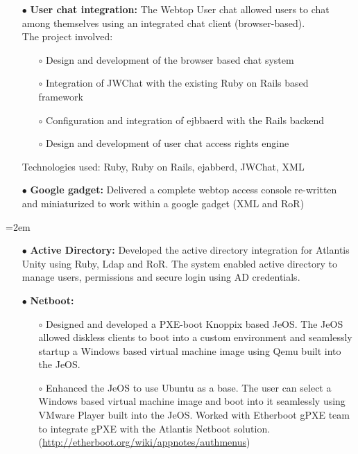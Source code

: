 \documentclass{scrartcl}
\newcommand{\MarginDate}[1]{\marginpar{\raggedleft\itshape\small#1}}
\newcommand{\Description}[1]{\hangindent=2em\hangafter=0\noindent\raggedright\footnotesize{#1}\par\normalsize}
\begin{document}
\begin{cv}{
\href{http://www.develmj.com}{}
}
{\begin{itemize}
\begin{itemize}
engine
    \end{itemize}
    Technologies used: Ruby, Ruby on Rails, Postgres, Gentoo Linux
  \item[\footnotesize$\bullet$] \textbf{User chat integration: }The Webtop User chat allowed users to chat among
    themselves using an integrated chat client (browser-based).\\
    The project involved:
    \begin{itemize}
    \item[\footnotesize$\circ$] Design and development of the browser based chat system
    \item[\footnotesize$\circ$] Integration of JWChat with the existing Ruby on Rails based framework
    \item[\footnotesize$\circ$] Configuration and integration of ejbbaerd with the Rails backend
    \item[\footnotesize$\circ$] Design and development of user chat
      access rights engine
    \end{itemize}
    Technologies used: Ruby, Ruby on Rails, ejabberd, JWChat, XML
  \item[\footnotesize$\bullet$] \textbf{Google gadget: }Delivered a complete
    webtop access console re-written and miniaturized to work within a
    google gadget (XML and RoR)
\end{itemize}
}

\vspace{0.5em}

\Description{
\begin{itemize}
  \item[\footnotesize$\bullet$] \textbf{Active Directory: }Developed\MarginDate{Atlantis Unity}
    the active directory integration for Atlantis Unity using Ruby, Ldap
    and RoR. The system
    enabled active directory to manage users, permissions and secure
    login using AD credentials.
  \item[\footnotesize$\bullet$] \textbf{Netboot:}
   \begin{itemize}
   \item[$\circ$]Designed and
     developed a PXE-boot Knoppix based JeOS. The JeOS allowed diskless
     clients to boot into a custom environment and seamlessly
     startup a Windows based virtual machine image using Qemu built into the JeOS.
   \item[$\circ$]Enhanced the JeOS to use Ubuntu as a base. The
     user can select a Windows based virtual machine image and boot into it seamlessly using VMware Player
     built into the JeOS. Worked with Etherboot gPXE team to integrate gPXE
     with the Atlantis Netboot
     solution.\\(\url{http://etherboot.org/wiki/appnotes/authmenus})
   \end{itemize}
\end{itemize}
}


\end{cv}
\end{document}
